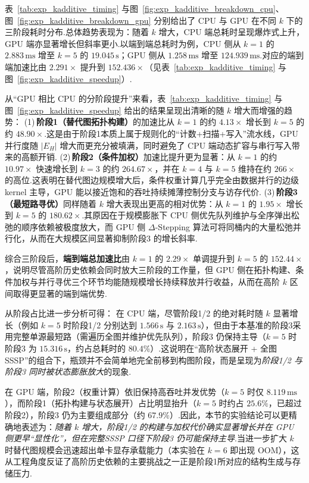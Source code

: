 



表~\ref{tab:exp_kadditive_timing} 与图~\ref{fig:exp_kadditive_breakdown_cpu}、图~\ref{fig:exp_kadditive_breakdown_gpu} 分别给出了 CPU 与 GPU 在不同 $k$ 下的三阶段耗时分布.总体趋势表现为：随着 $k$ 增大，CPU 端总耗时呈现爆炸式上升，GPU 端亦显著增长但斜率更小.以端到端总耗时为例，CPU 侧从 $k=1$ 的 $2.883\,\text{ms}$ 增至 $k=5$ 的 $19.045\,\text{s}$；GPU 侧从 $1.258\,\text{ms}$ 增至 $124.939\,\text{ms}$.对应的端到端加速比由 $2.291\times$ 提升到 $152.436\times$（见表~\ref{tab:exp_kadditive_timing} 与图~\ref{fig:exp_kadditive_speedup}）.

从“GPU 相比 CPU 的分阶段提升”来看，表~\ref{tab:exp_kadditive_timing} 与图~\ref{fig:exp_kadditive_speedup} 给出的结果呈现出清晰的随 $k$ 增大而增强的趋势：
(1)\,\textbf{阶段1（替代图拓扑构建）}的加速比从 $k=1$ 的约 $4.13\times$ 增长到 $k=5$ 的约 $48.90\times$.这是由于阶段1本质上属于规则化的“计数+扫描+写入”流水线，GPU 并行度随 $|E_H|$ 增大而更充分被填满，同时避免了 CPU 端动态扩容与串行写入带来的高额开销.
(2)\,\textbf{阶段2（条件加权）}加速比提升更为显著：从 $k=1$ 的约 $10.97\times$ 快速增长到 $k=3$ 的约 $264.67\times$，并在 $k=4$ 与 $k=5$ 维持在约 $266\times$ 的高位.这表明在替代图边规模增大后，条件权重计算几乎完全由数据并行的边级 kernel 主导，GPU 能以接近饱和的吞吐持续摊薄控制分支与访存代价.
(3)\,\textbf{阶段3（最短路寻优）}同样随着 $k$ 增大表现出更高的相对优势：从 $k=1$ 的 $1.95\times$ 增长到 $k=5$ 的 $180.62\times$.其原因在于规模膨胀下 CPU 侧优先队列维护与全序弹出松弛的顺序依赖被极度放大，而 GPU 侧 $\Delta$-Stepping 算法可将同桶内的大量松弛并行化，从而在大规模区间显著抑制阶段3 的增长斜率.

综合三阶段后，\textbf{端到端总加速比}由 $k=1$ 的 $2.29\times$ 单调提升到 $k=5$ 的 $152.44\times$，说明尽管高阶历史依赖会同时放大三阶段的工作量，但 GPU 侧在拓扑构建、条件加权与并行寻优三个环节均能随规模增长持续释放并行收益，从而在高阶 $k$ 区间取得更显著的端到端优势.

从阶段占比进一步分析可得：
在 CPU 端，尽管阶段1/2 的绝对耗时随 $k$ 显著增长（例如 $k=5$ 时阶段1/2 分别达到 $1.566\,\text{s}$ 与 $2.163\,\text{s}$），但由于本基准的阶段3采用完整单源最短路（需遍历全图并维护优先队列），阶段3 仍保持主导（$k=5$ 时阶段3 为 $15.316\,\text{s}$，约占总耗时的 $80.4\%$）.这说明在“高阶状态展开 + 全图 SSSP”的组合下，瓶颈并不会简单地完全前移到构图阶段，而是呈现为\emph{阶段1/2 与阶段3 同时被状态膨胀放大}的现象.

在 GPU 端，阶段2（权重计算）依旧保持高吞吐并发优势（$k=5$ 时仅 $8.119\,\text{ms}$），而阶段1（拓扑构建与状态展开）占比明显抬升（$k=5$ 时约占 $25.6\%$，已超过阶段2），阶段3 仍为主要组成部分（约 $67.9\%$）.因此，本节的实验结论可以更精确地表述为：\emph{随着 $k$ 增大，阶段1/2 的构建与加权代价确实显著增长并在 GPU 侧更早“显性化”，但在完整\allowbreak SSSP 口径下阶段3 仍可能保持主导}.当进一步扩大 $k$ 时替代图规模会迅速超出单卡显存承载能力（本实验在 $k=6$ 即出现 OOM），这从工程角度反证了高阶历史依赖的主要挑战之一正是阶段1所对应的结构生成与存储压力.

